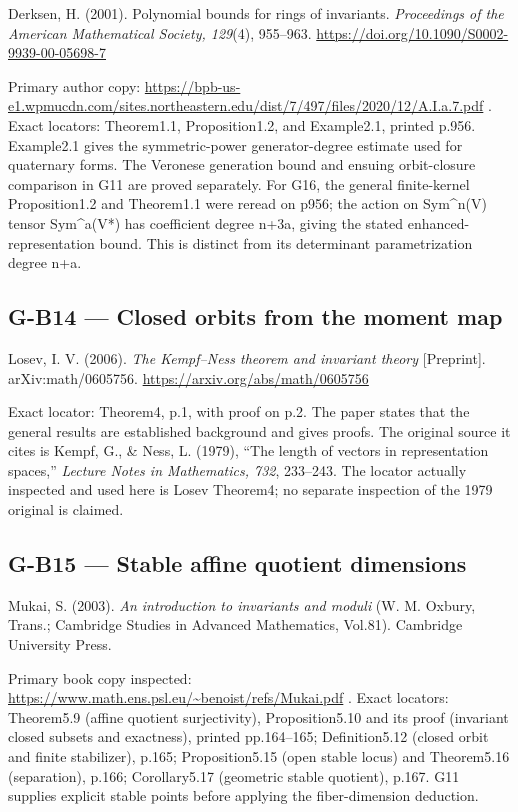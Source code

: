 \documentclass[11pt,a4paper]{article}
\theoremstyle{definition}\newtheorem{definition}{Definition}
\begin{document}
Derksen, H. (2001). Polynomial bounds for rings of invariants.
\emph{Proceedings of the American Mathematical Society, 129}(4),
955--963. \url{https://doi.org/10.1090/S0002-9939-00-05698-7}

Primary author copy:
\url{https://bpb-us-e1.wpmucdn.com/sites.northeastern.edu/dist/7/497/files/2020/12/A.I.a.7.pdf}
. Exact locators: Theorem1.1, Proposition1.2, and Example2.1, printed
p.956. Example2.1 gives the symmetric-power generator-degree estimate
used for quaternary forms. The Veronese generation bound and ensuing
orbit-closure comparison in G11 are proved separately. For G16, the
general finite-kernel Proposition1.2 and Theorem1.1 were reread on p956;
the action on Sym\^{}n(V) tensor Sym\^{}a(V*) has coefficient degree
n+3a, giving the stated enhanced-representation bound. This is distinct
from its determinant parametrization degree n+a.

\subsection{G-B14 --- Closed orbits from the moment
map}\label{g-b14--closed-orbits-from-the-moment-map}

Losev, I. V. (2006). \emph{The Kempf--Ness theorem and invariant theory}
{[}Preprint{]}. arXiv:math/0605756.
\url{https://arxiv.org/abs/math/0605756}

Exact locator: Theorem4, p.1, with proof on p.2. The paper states that
the general results are established background and gives proofs. The
original source it cites is Kempf, G., \& Ness, L. (1979), ``The length
of vectors in representation spaces,'' \emph{Lecture Notes in
Mathematics, 732}, 233--243. The locator actually inspected and used
here is Losev Theorem4; no separate inspection of the 1979 original is
claimed.

\subsection{G-B15 --- Stable affine quotient
dimensions}\label{g-b15--stable-affine-quotient-dimensions}

Mukai, S. (2003). \emph{An introduction to invariants and moduli} (W. M.
Oxbury, Trans.; Cambridge Studies in Advanced Mathematics, Vol.81).
Cambridge University Press.

Primary book copy inspected:
\url{https://www.math.ens.psl.eu/~benoist/refs/Mukai.pdf} . Exact
locators: Theorem5.9 (affine quotient surjectivity), Proposition5.10 and
its proof (invariant closed subsets and exactness), printed pp.164--165;
Definition5.12 (closed orbit and finite stabilizer), p.165;
Proposition5.15 (open stable locus) and Theorem5.16 (separation), p.166;
Corollary5.17 (geometric stable quotient), p.167. G11 supplies explicit
stable points before applying the fiber-dimension deduction.
\end{document}
